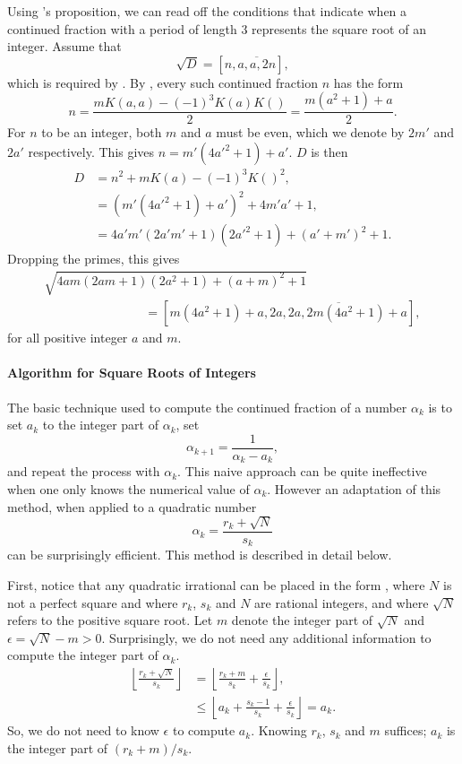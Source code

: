 Using {\MuirT}'s proposition, we can read off the conditions that
indicate when a continued fraction with a period of length $3$
represents the square root of an integer.  Assume that
\[
\sqrt{D} = [n, \overline{a, a, 2n}],
\]
which is required by .
By , every such continued fraction $n$ has
the form
\[
n = \frac{m K(a,a) - (-1)^3 K(a) K()}{2}
  = \frac{m(a^2+1) + a}{2}.
\]
For $n$ to be an integer, both $m$ and $a$ must be even, which we
denote by $2m'$ and $2a'$ respectively.  This gives
$n = m' (4{a'}^2 +1) + a'$.  $D$ is then
\[
\begin{aligned}
  D &= n^2 + m K(a) -(-1)^3 K()^2, \\
    & = (m' (4{a'}^2 +1) + a')^2 + 4 m'a' + 1, \\
    & = 4 a'm'(2a'm'+1)(2{a'}^2 +1) + (a'+m')^2 + 1.
\end{aligned}
\]
Dropping the primes, this gives
\[
\begin{array}{l}
\sqrt{4 am(2am+1)(2a^2 +1) + (a+m)^2 + 1}  \\[6pt]
\qquad\qquad\qquad\qquad =
   [m (4a^2 +1) + a, \overline{2a, 2a, 2m (4a^2 +1) + a}],
\end{array}
\]
for all positive integer $a$ and $m$.

\paragraph{Algorithm for Square Roots of Integers}

The basic technique used to compute the continued fraction of a number
$\alpha_k$ is to set $a_k$ to the integer part of $\alpha_k$, set
\[
\alpha_{k+1} = \frac{1}{\alpha_k - a_k},
\]
and repeat the process with $\alpha_k$.  This naive approach can be
quite ineffective when one only knows the numerical value of
$\alpha_k$.  However an adaptation of this method,  when applied
to a quadratic number
\begin{equation} \label{CF:Quad:Irr:Eq}
\alpha_k = \frac{r_k + \sqrt{N}}{s_k}
\end{equation}
can be surprisingly efficient.  This method is described in detail below.

First, notice that any quadratic irrational can be placed in the form
, where $N$ is not a perfect square and where
$r_k$, $s_k$ and $N$ are rational integers, and where $\sqrt{N}$
refers to the positive square root.  Let $m$ denote the integer part of
$\sqrt{N}$ and $\epsilon = \sqrt{N} - m > 0$.  Surprisingly, we do not
need any additional information to compute the integer part of
$\alpha_k$.
\[
\begin{aligned}
\displaystyle
 \left\lfloor \frac{r_k+\sqrt{N}}{s_k} \right\rfloor
 & \displaystyle
    = \left\lfloor \frac{r_k+m}{s_k} + \frac{\epsilon}{s_k} \right\rfloor, \\
  & \displaystyle
    \le \left\lfloor a_k + \frac{s_k - 1}{s_k} 
         + \frac{\epsilon}{s_k}\right\rfloor = a_k.
\end{aligned}
\]
So, we do not need to know $\epsilon$ to compute $a_k$.  Knowing $r_k$,
$s_k$ and $m$ suffices; $a_k$ is the integer part of $(r_k + m)/s_k$.

